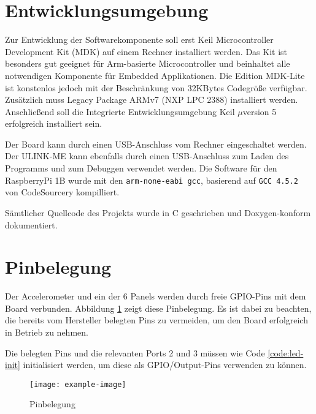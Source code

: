 \section{Entwicklungsumgebung}
Zur Entwicklung der Softwarekomponente soll erst Keil\textsuperscript{\scriptsize\textregistered} Microcontroller Development Kit (MDK) auf einem Rechner installiert werden. Das Kit ist besonders gut geeignet für Arm\textsuperscript{\scriptsize\textregistered}-basierte Microcontroller und beinhaltet alle notwendigen Komponente für Embedded Applikationen. Die Edition MDK-Lite ist konstenlos jedoch mit der Beschränkung von 32KBytes Codegröße verfügbar. Zusätzlich muss Legacy Package ARMv7 (NXP LPC 2388) installiert werden. Anschließend soll die Integrierte Entwicklungsumgebung Keil $\mu$version 5 erfolgreich installiert sein.

Der Board kann durch einen USB-Anschluss vom Rechner eingeschaltet werden. Der ULINK-ME kann ebenfalls durch einen USB-Anschluss zum Laden des Programms und zum Debuggen verwendet werden.
Die Software für den RaspberryPi 1B wurde mit den \texttt{arm-none-eabi gcc}, basierend auf \texttt{GCC 4.5.2} von CodeSourcery kompilliert.

Sämtlicher Quellcode des Projekts wurde in C geschrieben und Doxygen-konform dokumentiert.


\section{Pinbelegung}
Der Accelerometer und ein der 6 Panels werden durch freie GPIO-Pins mit dem Board verbunden. Abbildung \ref{fig:pins} zeigt diese Pinbelegung. Es ist dabei zu beachten, die bereits vom Hersteller belegten Pins zu vermeiden, um den Board erfolgreich in Betrieb zu nehmen.

Die belegten Pins und die relevanten Ports 2 und 3 müssen wie Code \ref{code:led-init} initialisiert werden, um diese als GPIO/Output-Pins verwenden zu können.

\begin{figure}
	\centering
	\texttt{[image: example-image]}
	\caption[Pinbelegung]{Pinbelegung}
	\label{fig:pins}
\end{figure}